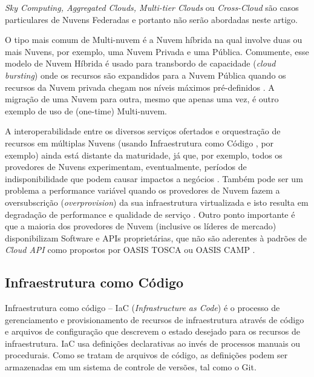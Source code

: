 \documentclass[12pt]{article}
\begin{document}
	\textit{Sky Computing, Aggregated Clouds, Multi-tier Clouds} ou \textit{Cross-Cloud} são casos particulares de Nuvens Federadas e portanto não serão abordadas neste artigo. 
	
	O tipo mais comum de Multi-nuvem é a Nuvem híbrida na qual involve duas ou mais Nuvens, por exemplo, uma Nuvem Privada e uma Pública. Comumente, esse modelo de Nuvem Híbrida é usado para transbordo de capacidade (\textit{cloud bursting}) onde os recursos são expandidos para a Nuvem Pública quando os recursos da Nuvem privada chegam nos níveis máximos pré-definidos \cite{Ferrer:2012}. A migração de uma Nuvem para outra, mesmo que apenas uma vez, é outro exemplo de uso de (one-time) Multi-nuvem.
	
	A interoperabilidade entre os diversos serviços ofertados e orquestração de recursos em múltiplas Nuvens (usando Infraestrutura como Código \cite{Morris:2016}, por exemplo) ainda está distante da maturidade, já que, por exemplo, todos os provedores de Nuvens experimentam, eventualmente, períodos de indisponibilidade que podem causar impactos a negócios \cite{Fisher:2018}. Também pode ser um problema a performance variável quando os provedores de Nuvem fazem a oversubscrição (\textit{overprovision}) da sua infraestrutura virtualizada e isto resulta em degradação de performance e qualidade de serviço \cite{CloudSpectator:2017}. Outro ponto importante é que a maioria dos provedores de Nuvem  (inclusive os líderes de mercado) disponibilizam Software e APIs proprietárias, que não são aderentes à padrões de \textit{Cloud API} como propostos por OASIS TOSCA \cite{TOSCA:2019} ou OASIS CAMP \cite{CAMP:2019}.
	
	\subsection{Infraestrutura como Código}
	
	Infraestrutura como código – IaC (\textit{Infrastructure as Code}) é o processo de gerenciamento e provisionamento de recursos de infraestrutura através de código e arquivos de configuração que descrevem o estado desejado para os recursos de infraestrutura. IaC usa definições declarativas ao invés de processos manuais ou procedurais. Como se tratam de arquivos de código, as definições podem ser armazenadas em um sistema de controle de versões, tal como o Git.
	
\end{document}

